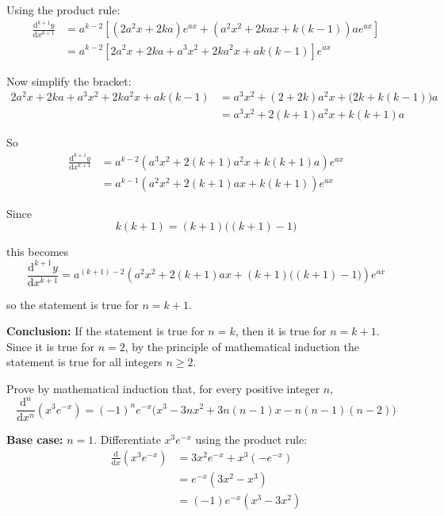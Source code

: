 \documentclass[leqno]{article}
\begin{document}
\begin{enumerate}[
  label=\textbf{\arabic*.},
  leftmargin=*,
  topsep=0pt,
  partopsep=0pt,
  parsep=0pt
]
\begin{djsSolution}
Using the product rule:
\begin{align*}
\frac{\mathrm{d}^{k+1}y}{\mathrm{d}x^{k+1}}
&=a^{k-2}\left[\left(2a^2x+2ka\right)e^{ax}+\left(a^2x^2+2kax+k(k-1)\right)ae^{ax}\right] \\
&=a^{k-2}\left[2a^2x+2ka+a^3x^2+2ka^2x+ak(k-1)\right]e^{ax}
\end{align*}

Now simplify the bracket:
\begin{align*}
2a^2x+2ka+a^3x^2+2ka^2x+ak(k-1)
&=a^3x^2+(2+2k)a^2x+\bigl(2k+k(k-1)\bigr)a \\
&=a^3x^2+2(k+1)a^2x+k(k+1)a
\end{align*}

So
\begin{align*}
\frac{\mathrm{d}^{k+1}y}{\mathrm{d}x^{k+1}}
&=a^{k-2}\left(a^3x^2+2(k+1)a^2x+k(k+1)a\right)e^{ax} \\
&=a^{k-1}\left(a^2x^2+2(k+1)ax+k(k+1)\right)e^{ax}
\end{align*}

Since
\[
k(k+1)=(k+1)\bigl((k+1)-1\bigr)
\]

this becomes
\[
\frac{\mathrm{d}^{k+1}y}{\mathrm{d}x^{k+1}}
=a^{(k+1)-2}\left(a^2x^2+2(k+1)ax+(k+1)\bigl((k+1)-1\bigr)\right)e^{ax}
\]

so the statement is true for \(n=k+1\).

\textbf{Conclusion:} If the statement is true for \(n=k\), then it is true for \(n=k+1\). Since it is true for \(n=2\), by the principle of mathematical induction the statement is true for all integers \(n\ge 2\).
\end{djsSolution}


\newpage

\questionitem

Prove by mathematical induction that, for every positive integer $n$,
\[
\frac{\mathrm{d}^n}{\mathrm{d}x^n}(x^3 e^{-x}) = (-1)^n e^{-x}\bigl(x^3 - 3n x^2 + 3n(n-1)x - n(n-1)(n-2)\bigr)
\] 

\vspace*{10pt}

\begin{djsSolution}
\textbf{Base case:} \(n=1\). Differentiate \(x^3e^{-x}\) using the product rule:
\begin{align*}
\frac{\mathrm{d}}{\mathrm{d}x}(x^3e^{-x})
&=3x^2e^{-x}+x^3(-e^{-x})\\
&=e^{-x}(3x^2-x^3)\\
&=(-1)e^{-x}(x^3-3x^2)
\end{align*}


\end{djsSolution}
\end{enumerate}
\end{document}

